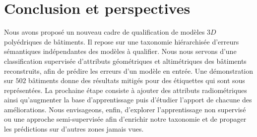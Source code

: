 \documentclass[a4paper,french]{article}
\begin{document}
    \section{Conclusion et perspectives}

    Nous avons proposé un nouveau cadre de qualification de modèles $3D$ polyédriques de bâtiments. Il repose sur une taxonomie hiérarchisée d'erreurs sémantiques indépendantes des modèles à qualifier. Nous nous servons d'une classification supervisée d'attributs géométriques et altimétriques des bâtiments reconstruits, afin de prédire les erreurs d'un modèle en entrée. Une démonstration sur $502$ bâtiments donne des résultats mitigés pour des étiquettes qui sont sous représentées. La prochaine étape consiste à ajouter des attributs radiométriques ainsi qu'augmenter la base d'apprentissage puis d'étudier {\color{black}l'apport de chacune des améliorations}. Nous envisageons, enfin, d'explorer l'apprentissage non supervisé ou une approche semi-supervisée afin d'enrichir notre taxonomie et de propager les prédictions sur d'autres zones jamais vues.

    
    \begin{spacing}{0.01}
        
    \end{spacing}
\end{document}
